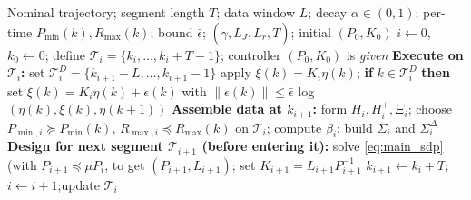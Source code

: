 \documentclass[letterpaper, 10 pt, conference]{ieeeconf}
\begin{document}
\begin{algorithm}[t]
\caption{Online Data-Driven Funnel Control}
\label{alg:online_control}
\begin{algorithmic}[1]
\Require Nominal trajectory; segment length $T$; data window $L$; decay $\alpha\in(0,1)$; per-time $P_{\min}(k),R_{\max}(k)$; bound $\bar\epsilon$; $(\gamma,L_J,L_r,\widetilde T)$; initial $(P_0,K_0)$
\State $i\gets0$, $k_0\gets0$; define $\mathcal{T}_i=\{k_i,\dots,k_i{+}T{-}1\}$; controller $(P_0,K_0)$ is \emph{given}
  \State \textbf{Execute on $\mathcal{T}_i$:} set $\mathcal{T}_i^D=\{k_{i+1}{-}L,\dots,k_{i+1}{-}1\}$
    \State apply $\xi(k)=K_i\eta(k)$; \textbf{if} $k\in\mathcal{T}_i^D$ \textbf{then} set $\xi(k)= K_i\eta(k)+\epsilon(k)$ with $\|\epsilon(k)\|\le\bar\epsilon$
    \State log $(\eta(k),\xi(k),\eta(k{+}1))$
  \EndFor
  \State \textbf{Assemble data at $k_{i+1}$:} form $H_i,H_i^+,\Xi_i$; choose $P_{\min,i}\succeq P_{\min}(k)$, $R_{\max,i}\preceq R_{\max}(k)$ on $\mathcal{T}_i$; compute $\beta_i$; build $\Sigma_i$ and $\Sigma_i^\Delta$
  \State \textbf{Design for next segment $\mathcal{T}_{i+1}$ (before entering it):} solve \eqref{eq:main_sdp} (with $P_{i+1}\preceq \mu P_i$, to get $(P_{i+1},L_{i+1})$; set $K_{i+1}=L_{i+1}P_{i+1}^{-1}$
  \State $k_{i+1}\gets k_i{+}T$;\quad $i\gets i{+}1$;\quad update $\mathcal{T}_i$
\EndWhile
\end{algorithmic}
\end{algorithm}
\end{document}
